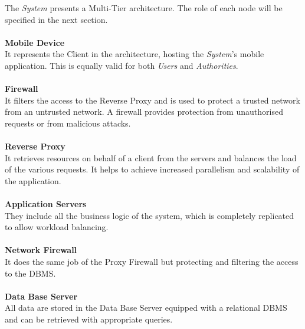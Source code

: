 \documentclass{article}
\begin{document}
	The {\it System} presents a Multi-Tier architecture. The role of each node will be specified in the next section. \\ \\
			{\bf Mobile Device} \\
			It represents the Client in the architecture, hosting the {\it System}'s mobile application. This is equally valid for both {\it Users} and {\it Authorities}. \\ \\
			{\bf Firewall}\\
			It filters the access to the Reverse Proxy and is used to protect a trusted network from an untrusted network. A firewall provides protection from unauthorised requests or from malicious attacks. \\ \\
			{\bf Reverse Proxy}\\
			It retrieves resources on behalf of a client from the servers and balances the load of the various requests. It helps to achieve increased parallelism and scalability of the application. \\ \\
			{\bf Application Servers}\\
			They include all the business logic of the system, which is completely replicated to allow workload balancing. \\ \\
			{\bf Network Firewall}\\
			It does the same job of the Proxy Firewall but protecting and filtering the access to the DBMS. \\ \\
			{\bf Data Base Server}\\
			All data are stored in the Data Base Server equipped with a relational DBMS and can be retrieved with appropriate queries.
\end{document}
